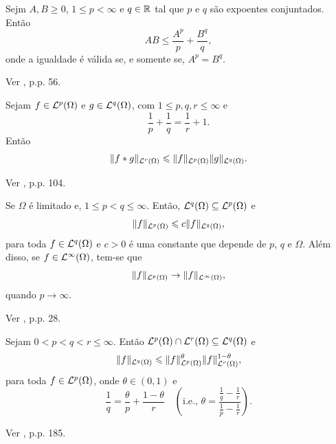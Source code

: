\begin{tbox} \label{thm:desigualdade-de-young}
    Sejm $A,B \geqslant 0$, $1 \leqslant p < \infty$ e $q \in \mathbb{R}$ tal que $p$ e $q$ são expoentes conjuntados. Então
    \[
        AB \leqslant \frac{A^p}{p} + \frac{B^q}{q},
    \]
    onde a igualdade é válida se, e somente se, $A^p = B^q$.
\end{tbox}
\begin{prf}
    Ver \cite{bartle-measure.theory}, p.p. 56.
\end{prf}

\begin{tbox} \label{thm:desigualde-de-young-para-convolucoes}
    Sejam $f \in \mathcal{L}^p(\Omega)$ e $g \in \mathcal{L}^q(\Omega)$, com $1 \leqslant p,q,r \leqslant \infty$ e
    \[
        \frac{1}{p} + \frac{1}{q} = \frac{1}{r} +1.
    \]
    Então
    \[
        \Vert f * g \Vert_{\mathcal{L}^r(\Omega)} \leqslant \Vert f \Vert_{\mathcal{L}^p(\Omega)} \Vert g \Vert_{\mathcal{L}^q(\Omega)}.
    \]
\end{tbox}
\begin{prf}
    Ver \cite{brezis-functional.analysis}, p.p. 104.
\end{prf}

\begin{tbox} \label{thm:omega-limitado}
    Se $\Omega$ é limitado e, $1 \leqslant p < q \leqslant \infty$.
    Então, $\mathcal{L}^q(\Omega) \subseteq \mathcal{L}^p(\Omega)$ e 
    \[
        \Vert f \Vert_{\mathcal{L}^p(\Omega)} \leqslant c \Vert f \Vert_{\mathcal{L}^q(\Omega)},
    \]
    para toda $f \in \mathcal{L}^q(\Omega)$ e $c > 0$ é uma constante que depende de $p$, $q$ e $\Omega$.
    Além disso, se $f \in \mathcal{L}^\infty(\Omega)$, tem-se que
    \[
        \Vert f \Vert_{\mathcal{L}^p(\Omega)} \to \Vert f  \Vert_{\mathcal{L}^\infty(\Omega)},
    \]
    quando $p \to \infty$.
\end{tbox}
\begin{prf}
    Ver \cite{adams-sobolev}, p.p. 28.
\end{prf}

\begin{tbox} \label{thm:desigualdade-de-inteporlacao}
    Sejam $0 < p < q < r \leqslant \infty$.
    Então $\mathcal{L}^p(\Omega) \cap \mathcal{L}^r(\Omega) \subseteq \mathcal{L}^q(\Omega)$ e
    \[
        \Vert f \Vert_{\mathcal{L}^q(\Omega)} \leqslant \Vert f \Vert_{\mathcal{L}^p(\Omega)}^\theta \Vert f \Vert_{\mathcal{L}^r(\Omega)}^{1 - \theta},
    \]
    para toda $f \in \mathcal{L}^p(\Omega)$,
    onde $\theta \in (0,1)$ e
    \begin{equation*} \label{eq:3}
        \frac{1}{q} = \frac{\theta}{p} + \frac{1 - \theta}{r} \quad \left( \text{i.e., } \theta = \frac{\frac{1}{q} - \frac{1}{r}}{\frac{1}{p} - \frac{1}{r}}\right).
    \end{equation*}
\end{tbox}
\begin{prf}
    Ver \cite{folland-real.analysis}, p.p. 185.
\end{prf}


